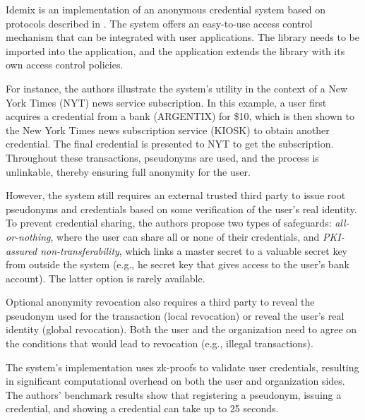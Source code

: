 Idemix \cite{idemix} is an implementation of an anonymous credential system based on protocols described in \cite{Camenisch2001AnES}. The system offers an easy-to-use access control mechanism that can be integrated with user applications. The library needs to be imported into the application, and the application extends the library with its own access control policies.

For instance, the authors illustrate the system's utility in the context of a New York Times (NYT) news service subscription. In this example, a user first acquires a credential from a bank (ARGENTIX) for \$10, which is then shown to the New York Times news subscription service (KIOSK) to obtain another credential. The final credential is presented to NYT to get the subscription. Throughout these transactions, pseudonyms are used, and the process is unlinkable, thereby ensuring full anonymity for the user.

However, the system still requires an external trusted third party to issue root pseudonyms and credentials based on some verification of the user's real identity. To prevent credential sharing, the authors propose two types of safeguards: \textit{all-or-nothing}, where the user can share all or none of their credentials, and \textit{PKI-assured non-transferability}, which links a master secret to a valuable secret key from outside the system (e.g., he secret key that gives access to the user's bank account). The latter option is rarely available.

Optional anonymity revocation also requires a third party to reveal the pseudonym used for the transaction (local revocation) or reveal the user's real identity (global revocation). Both the user and the organization need to agree on the conditions that would lead to revocation (e.g., illegal transactions).

The system's implementation uses zk-proofs to validate user credentials, resulting in significant computational overhead on both the user and organization sides. The authors' benchmark results show that registering a pseudonym, issuing a credential, and showing a credential can take up to 25 seconds.
